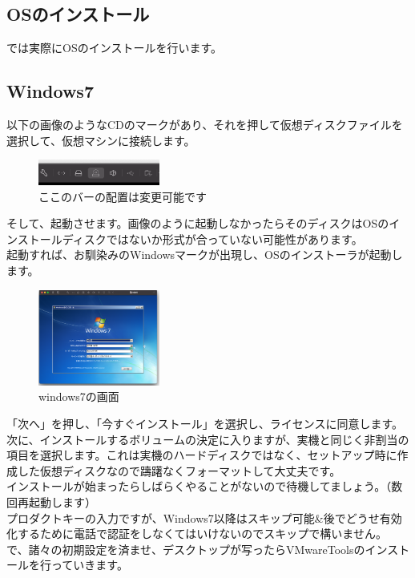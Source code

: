 \documentclass[b5paper,9pt,platex,dvipdfmx]{jsarticle}
\begin{document}
\begin{multicols*}{3}
\section{OSのインストール}
では実際にOSのインストールを行います。\\
\subsection{Windows7}
以下の画像のようなCDのマークがあり、それを押して仮想ディスクファイルを選択して、仮想マシンに接続します。\\
\begin{figure}[H]
  \centering
  \includegraphics[width=4cm]{3.png}
  \caption{ここのバーの配置は変更可能です}
\end{figure}
そして、起動させます。画像のように起動しなかったらそのディスクはOSのインストールディスクではないか形式が合っていない可能性があります。\\
起動すれば、お馴染みのWindowsマークが出現し、OSのインストーラが起動します。\\
\begin{figure}[H]
  \centering
  \includegraphics[width=4cm]{win7-cd.png}
  \caption{windows7の画面}
\end{figure}
「次へ」を押し、「今すぐインストール」を選択し、ライセンスに同意します。\\
次に、インストールするボリュームの決定に入りますが、実機と同じく非割当の項目を選択します。これは実機のハードディスクではなく、セットアップ時に作成した仮想ディスクなので躊躇なくフォーマットして大丈夫です。\\
インストールが始まったらしばらくやることがないので待機してましょう。（数回再起動します）\\
プロダクトキーの入力ですが、Windows7以降はスキップ可能\&後でどうせ有効化するために電話で認証をしなくてはいけないのでスキップで構いません。\\
で、諸々の初期設定を済ませ、デスクトップが写ったらVMwareToolsのインストールを行っていきます。\\

\end{multicols*}
\end{document}
